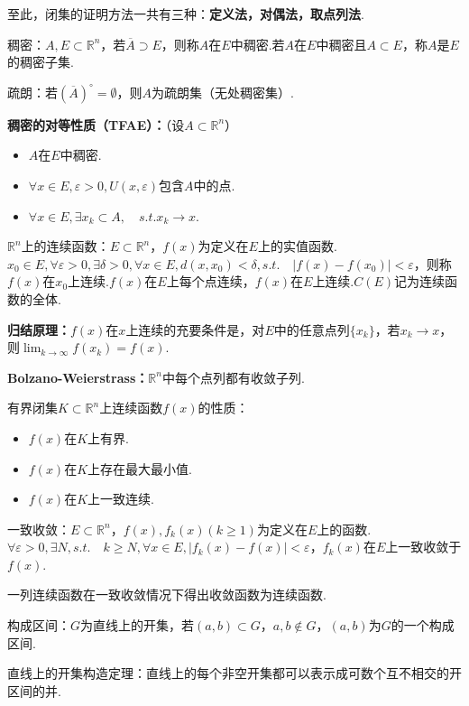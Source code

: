 \documentclass[bwprint, withoutpreface]{cumcmthesis}
\begin{document}
至此，闭集的证明方法一共有三种：\textbf{定义法，对偶法，取点列法}.

稠密：$A, E \subset \mathbb{R}^n$，若$\overline{A} \supset E$，则称$A$在$E$中稠密.若$A$在$E$中稠密且$A \subset E$，称$A$是$E$的稠密子集.

疏朗：若${(\overline{A})}^\circ=\emptyset$，则$A$为疏朗集（无处稠密集）.

\textbf{稠密的对等性质（TFAE）：}（设$A \subset \mathbb{R}^n$）
\begin{itemize}[itemindent=2em]
	\item $A$在$E$中稠密.
	\item $\forall x \in E, \varepsilon > 0, U(x, \varepsilon) \mbox{包含$A$中的点}$.
	\item $\forall x \in E, \exists {x_k} \subset A, \quad s.t. x_k \to x$.
\end{itemize}

$\mathbb{R}^n$上的连续函数：$E \subset \mathbb{R}^n$，$f(x)$为定义在$E$上的实值函数.$x_0 \in E, \forall \varepsilon > 0, \exists \delta > 0, \forall x \in E, d(x, x_0) < \delta, s.t. \quad |f(x) - f(x_0)| < \varepsilon$，则称$f(x)$在$x_0$上连续.$f(x)$在$E$上每个点连续，$f(x)$在$E$上连续.$C(E)$记为连续函数的全体.

\textbf{归结原理：}$f(x)$在$x$上连续的充要条件是，对$E$中的任意点列$\{x_k\}$，若$x_k \to x$，则$\lim_{k \to \infty}f(x_k) = f(x)$.

\textbf{Bolzano-Weierstrass：}$\mathbb{R}^n$中每个点列都有收敛子列.

有界闭集$K \subset \mathbb{R}^n$上连续函数$f(x)$的性质：
\begin{itemize}[itemindent=2em]
	\item $f(x)$在$K$上有界.
	\item $f(x)$在$K$上存在最大最小值.
	\item $f(x)$在$K$上一致连续.
\end{itemize}

一致收敛：$E \subset \mathbb{R}^n$，$f(x),f_k(x)(k \geqslant 1)$为定义在$E$上的函数.$\forall \varepsilon > 0, \exists N, s.t. \quad k \geqslant N, \forall x \in E, |f_k(x) - f(x)| < \varepsilon$，$f_k(x)$在$E$上一致收敛于$f(x)$.

一列连续函数在一致收敛情况下得出收敛函数为连续函数.

构成区间：$G$为直线上的开集，若$(a, b) \subset G$，$a, b \not\in G$，$(a, b)$为$G$的一个构成区间.

直线上的开集构造定理：直线上的每个非空开集都可以表示成可数个互不相交的开区间的并.
\end{document}
